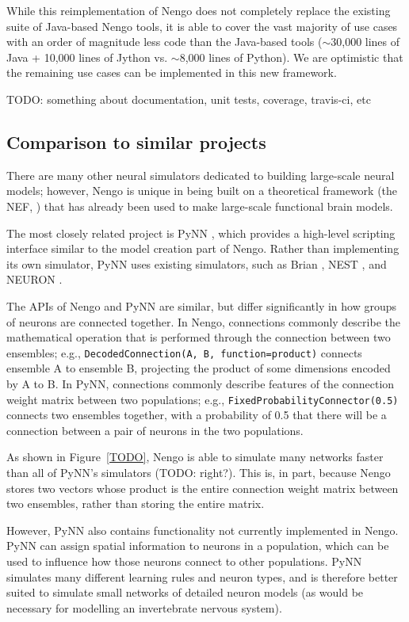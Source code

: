 \documentclass{frontiersSCNS}
\begin{document}
While this reimplementation of Nengo
does not completely replace
the existing suite of Java-based Nengo tools,
it is able to cover the vast majority of use cases
with an order of magnitude less
code than the Java-based tools
($\sim$30,000 lines of Java + 10,000 lines of Jython
vs. $\sim$8,000 lines of Python).
We are optimistic that the remaining use cases
can be implemented in this new framework.

TODO: something about documentation, unit tests,
coverage, travis-ci, etc

\subsection{Comparison to similar projects}

There are many other neural simulators
dedicated to building large-scale neural models;
however, Nengo is unique in being built
on a theoretical framework (the NEF, \cite{TODO})
that has already been used to make
large-scale functional brain models.

The most closely related project is PyNN
\cite{TODO},
which provides a high-level scripting
interface similar to the
model creation part of Nengo.
Rather than implementing its
own simulator, PyNN uses existing
simulators, such as Brian \cite{TODO},
NEST \cite{TODO}, and NEURON \cite{TODO}.

The APIs of Nengo and PyNN are similar,
but differ significantly
in how groups of neurons are connected together.
In Nengo, connections commonly describe
the mathematical operation that is performed
through the connection between
two ensembles;
e.g., \texttt{DecodedConnection(A, B,
function=product)} connects ensemble A
to ensemble B, projecting the product of
some dimensions encoded by A to B.
In PyNN, connections commonly describe
features of the connection weight matrix
between two populations;
e.g., \texttt{FixedProbabilityConnector(0.5)}
connects two ensembles together,
with a probability of 0.5
that there will be a connection
between a pair of neurons in the two populations.

As shown in Figure~\ref{TODO},
Nengo is able to simulate many networks
faster than all of PyNN's simulators
(TODO: right?).
This is, in part, because Nengo stores two vectors
whose product is the entire
connection weight matrix between
two ensembles, rather than storing
the entire matrix.

However, PyNN also contains functionality
not currently implemented in Nengo.
PyNN can assign spatial information
to neurons in a population,
which can be used to influence
how those neurons connect to other populations.
PyNN simulates many different learning rules
and neuron types,
and is therefore better suited to
simulate small networks of detailed neuron models
(as would be necessary for modelling
an invertebrate nervous system).
\end{document}
